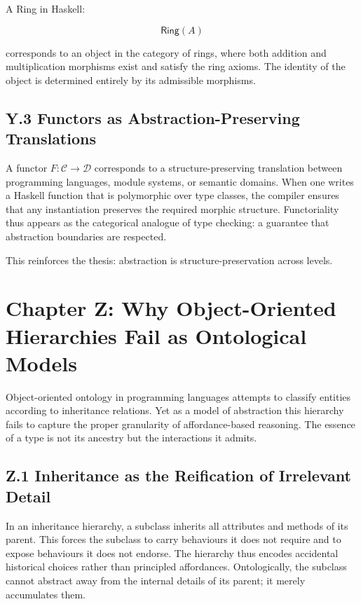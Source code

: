 \documentclass[12pt,letterpaper]{article}
\begin{document}
A Ring in Haskell:

\[
\mathsf{Ring}(A)
\]

corresponds to an object in the category of rings, where both addition and multiplication morphisms exist and satisfy the ring axioms. The identity of the object is determined entirely by its admissible morphisms.

\subsection{Y.3 Functors as Abstraction-Preserving Translations}

A functor \(F : \mathcal{C} \to \mathcal{D}\) corresponds to a structure-preserving translation between programming languages, module systems, or semantic domains. When one writes a Haskell function that is polymorphic over type classes, the compiler ensures that any instantiation preserves the required morphic structure. Functoriality thus appears as the categorical analogue of type checking: a guarantee that abstraction boundaries are respected.

This reinforces the thesis: abstraction is structure-preservation across levels.

\newpage

\section{Chapter Z: Why Object-Oriented Hierarchies Fail as Ontological Models}

Object-oriented ontology in programming languages attempts to classify entities according to inheritance relations. Yet as a model of abstraction this hierarchy fails to capture the proper granularity of affordance-based reasoning. The essence of a type is not its ancestry but the interactions it admits.

\subsection{Z.1 Inheritance as the Reification of Irrelevant Detail}

In an inheritance hierarchy, a subclass inherits all attributes and methods of its parent. This forces the subclass to carry behaviours it does not require and to expose behaviours it does not endorse. The hierarchy thus encodes accidental historical choices rather than principled affordances. Ontologically, the subclass cannot abstract away from the internal details of its parent; it merely accumulates them.
\end{document}
